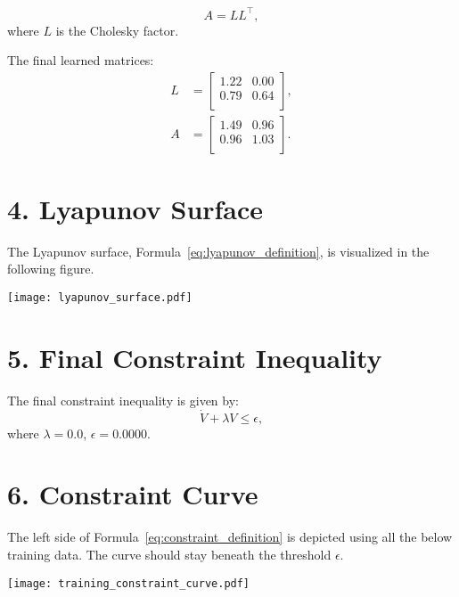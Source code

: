 \documentclass[11pt]{article}
\begin{document}
\begin{equation}
A = L L^\top,
\end{equation}
where $L$ is the Cholesky factor.

The final learned matrices:
\begin{align}
L &= \begin{bmatrix}
1.22 & 0.00 \\
0.79 & 0.64 \\
\end{bmatrix}, \\
A &= \begin{bmatrix}
1.49 & 0.96 \\
0.96 & 1.03 \\
\end{bmatrix}.
\end{align}

\section*{4. Lyapunov Surface}
The Lyapunov surface, Formula~\eqref{eq:lyapunov_definition}, is visualized in the following figure.
\begin{center}
\texttt{[image: lyapunov\_surface.pdf]}
\end{center}

\section*{5. Final Constraint Inequality}
The final constraint inequality is given by:
\begin{equation}
\dot{V} + \lambda V \leq \epsilon,
\label{eq:constraint_definition}
\end{equation}
where $\lambda = 0.0$, $\epsilon = 0.0000$.

\section*{6. Constraint Curve}
The left side of Formula~\eqref{eq:constraint_definition} is depicted using all the below training data. The curve should stay beneath the threshold $\epsilon$.

\begin{center}
\texttt{[image: training\_constraint\_curve.pdf]}
\end{center}
\end{document}
